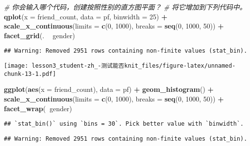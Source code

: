 \documentclass[]{article}
\newenvironment{Shaded}{\begin{snugshade}}{\end{snugshade}}
\newcommand{\CommentTok}[1]{\textcolor[rgb]{0.56,0.35,0.01}{\textit{#1}}}
\newcommand{\DataTypeTok}[1]{\textcolor[rgb]{0.13,0.29,0.53}{#1}}
\newcommand{\DecValTok}[1]{\textcolor[rgb]{0.00,0.00,0.81}{#1}}
\newcommand{\KeywordTok}[1]{\textcolor[rgb]{0.13,0.29,0.53}{\textbf{#1}}}
\newcommand{\NormalTok}[1]{#1}
\newcommand{\OperatorTok}[1]{\textcolor[rgb]{0.81,0.36,0.00}{\textbf{#1}}}
\newcommand{\StringTok}[1]{\textcolor[rgb]{0.31,0.60,0.02}{#1}}
\begin{document}
\begin{Shaded}
\begin{Highlighting}[]
\CommentTok{# 你会输入哪个代码，创建按照性别的直方图平面？}
\CommentTok{# 将它增加到下列代码中。}
\KeywordTok{qplot}\NormalTok{(}\DataTypeTok{x =}\NormalTok{ friend_count, }\DataTypeTok{data =}\NormalTok{ pf, }\DataTypeTok{binwidth =} \DecValTok{25}\NormalTok{) }\OperatorTok{+}
\StringTok{  }\KeywordTok{scale_x_continuous}\NormalTok{(}\DataTypeTok{limits =} \KeywordTok{c}\NormalTok{(}\DecValTok{0}\NormalTok{, }\DecValTok{1000}\NormalTok{),}
                     \DataTypeTok{breaks =} \KeywordTok{seq}\NormalTok{(}\DecValTok{0}\NormalTok{, }\DecValTok{1000}\NormalTok{, }\DecValTok{50}\NormalTok{)) }\OperatorTok{+}
\StringTok{  }\KeywordTok{facet_grid}\NormalTok{(. }\OperatorTok{~}\StringTok{ }\NormalTok{gender) }
\end{Highlighting}
\end{Shaded}

\begin{verbatim}
## Warning: Removed 2951 rows containing non-finite values (stat_bin).
\end{verbatim}

\texttt{[image: lesson3\_student-zh\_-测试能否knit\_files/figure-latex/unnamed-chunk-13-1.pdf]}

\begin{Shaded}
\begin{Highlighting}[]
\KeywordTok{ggplot}\NormalTok{(}\KeywordTok{aes}\NormalTok{(}\DataTypeTok{x =}\NormalTok{ friend_count), }\DataTypeTok{data =}\NormalTok{ pf) }\OperatorTok{+}\StringTok{ }
\StringTok{  }\KeywordTok{geom_histogram}\NormalTok{() }\OperatorTok{+}\StringTok{ }
\StringTok{  }\KeywordTok{scale_x_continuous}\NormalTok{(}\DataTypeTok{limits =} \KeywordTok{c}\NormalTok{(}\DecValTok{0}\NormalTok{, }\DecValTok{1000}\NormalTok{), }\DataTypeTok{breaks =} \KeywordTok{seq}\NormalTok{(}\DecValTok{0}\NormalTok{, }\DecValTok{1000}\NormalTok{, }\DecValTok{50}\NormalTok{)) }\OperatorTok{+}\StringTok{ }
\StringTok{  }\KeywordTok{facet_wrap}\NormalTok{(}\OperatorTok{~}\NormalTok{gender)}
\end{Highlighting}
\end{Shaded}

\begin{verbatim}
## `stat_bin()` using `bins = 30`. Pick better value with `binwidth`.
\end{verbatim}

\begin{verbatim}
## Warning: Removed 2951 rows containing non-finite values (stat_bin).
\end{verbatim}
\end{document}
